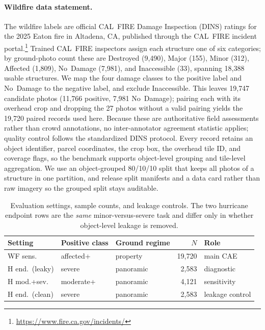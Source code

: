 \documentclass[sigconf]{acmart}
\begin{document}
\paragraph{Wildfire data statement.}
The wildfire labels are official CAL~FIRE Damage Inspection (DINS) ratings for
the 2025 Eaton fire in Altadena, CA, published through the CAL~FIRE incident
portal.\footnote{\url{https://www.fire.ca.gov/incidents/}} Trained CAL~FIRE
inspectors assign each structure one of six categories; by ground-photo count
these are Destroyed (9{,}490), Major (155), Minor (312), Affected (1{,}809),
No~Damage (7{,}981), and Inaccessible (33), spanning 18{,}388 usable structures.
We map the four damage classes to the positive label and No~Damage to the
negative label, and exclude Inaccessible. This leaves 19{,}747 candidate photos
(11{,}766 positive, 7{,}981 No~Damage); pairing each with its overhead crop and
dropping the 27 photos without a valid pairing yields the 19{,}720 paired
records used here. Because these are authoritative field assessments rather than
crowd annotations, no inter-annotator agreement statistic applies; quality
control follows the standardized DINS protocol. Every record retains an object
identifier, parcel coordinates, the crop box, the overhead tile ID, and coverage
flags, so the benchmark supports object-level grouping and tile-level
aggregation. We use an object-grouped 80/10/10 split that keeps all photos of a
structure in one partition, and release split manifests and a data card rather
than raw imagery so the grouped split stays auditable.

\begin{table}[t]
  \caption{Evaluation settings, sample counts, and leakage controls. The two
  hurricane endpoint rows are the \emph{same} minor-versus-severe task and
  differ only in whether object-level leakage is removed.}
  \label{tab:settings}
  \centering
  \scriptsize
  \setlength{\tabcolsep}{2.5pt}
  \begin{tabular}{lllrl}
    \toprule
    Setting & Positive class & Ground regime & $N$ & Role \\
    \midrule
    WF sens.        & affected+ & property  & 19{,}720 & main CAE \\
    H end.\ (leaky) & severe    & panoramic & 2{,}583  & diagnostic \\
    H mod.+sev.     & moderate+ & panoramic & 4{,}121  & sensitivity \\
    H end.\ (clean) & severe    & panoramic & 2{,}583  & leakage control \\
    \bottomrule
  \end{tabular}
\end{table}
\end{document}
